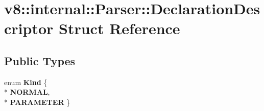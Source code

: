 \hypertarget{structv8_1_1internal_1_1_parser_1_1_declaration_descriptor}{}\section{v8\+:\+:internal\+:\+:Parser\+:\+:Declaration\+Descriptor Struct Reference}
\label{structv8_1_1internal_1_1_parser_1_1_declaration_descriptor}
\subsection*{Public Types}
\begin{DoxyCompactItemize}
\item 
enum {\bfseries Kind} \{ \\*
{\bfseries N\+O\+R\+M\+AL}, 
\\*
{\bfseries P\+A\+R\+A\+M\+E\+T\+ER}
 \}\hypertarget{structv8_1_1internal_1_1_parser_1_1_declaration_descriptor_a96c7c70759c391c7ed4e1da4295bb6d3}{}\label{structv8_1_1internal_1_1_parser_1_1_declaration_descriptor_a96c7c70759c391c7ed4e1da4295bb6d3}

\end{DoxyCompactItemize}
